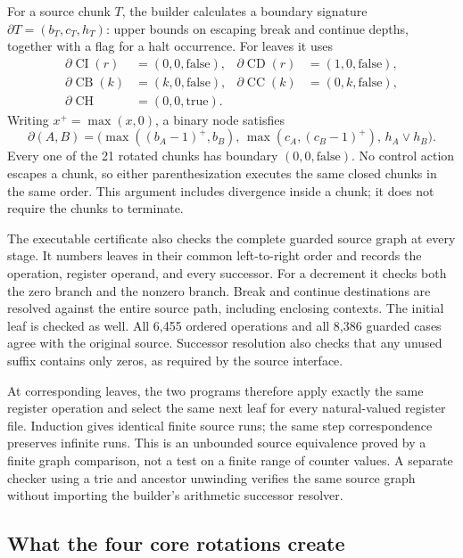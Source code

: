 For a source chunk $T$, the builder calculates a boundary signature
$\partial T=(b_T,c_T,h_T)$: upper bounds on escaping break and continue
depths, together with a flag for a halt occurrence.  For leaves it uses
\[
\begin{aligned}
 \partial\operatorname{CI}(r)&=(0,0,\mathrm{false}),&
 \partial\operatorname{CD}(r)&=(1,0,\mathrm{false}),\\
 \partial\operatorname{CB}(k)&=(k,0,\mathrm{false}),&
 \partial\operatorname{CC}(k)&=(0,k,\mathrm{false}),\\
 \partial\operatorname{CH}&=(0,0,\mathrm{true}).
\end{aligned}
\]
Writing $x^+=\max(x,0)$, a binary node satisfies
\[
 \partial(A,B)=
 \bigl(\max((b_A-1)^+,b_B),\,
       \max(c_A,(c_B-1)^+),\,h_A\lor h_B\bigr).
\]
Every one of the 21 rotated chunks has boundary
$(0,0,\mathrm{false})$.  No control action escapes a chunk, so either
parenthesization executes the same closed chunks in the same order.
This argument includes divergence inside a chunk; it does not require
the chunks to terminate.

The executable certificate also checks the complete guarded source
graph at every stage.  It numbers leaves in their common left-to-right
order and records the operation, register operand, and every successor.
For a decrement it checks both the zero branch and the nonzero branch.
Break and continue destinations are resolved against the entire source
path, including enclosing contexts.  The initial leaf is checked as
well.  All 6,455 ordered operations and all 8,386 guarded cases agree
with the original source.  Successor resolution also checks that any
unused suffix contains only zeros, as required by the source interface.

At corresponding leaves, the two programs therefore apply exactly the
same register operation and select the same next leaf for every
natural-valued register file.  Induction gives identical finite source
runs; the same step correspondence preserves infinite runs.  This is
an unbounded source equivalence proved by a finite graph comparison,
not a test on a finite range of counter values.  A separate checker
using a trie and ancestor unwinding verifies the same source graph
without importing the builder's arithmetic successor resolver.

\subsection{What the four core rotations create}

